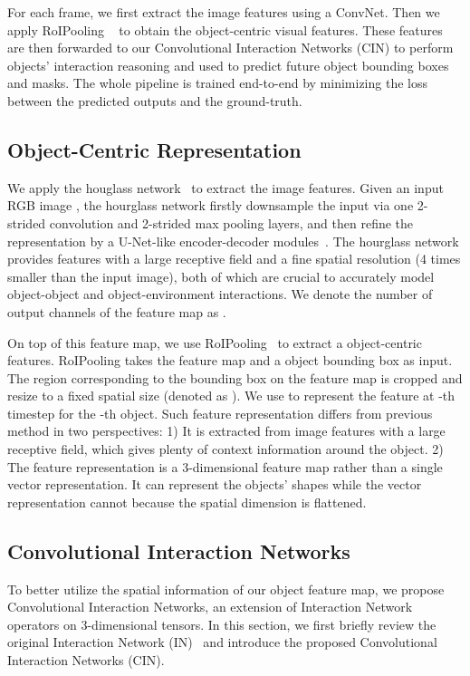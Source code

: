 \documentclass{article} \usepackage{iclr2021_conference,times}
\begin{document}
For each frame, we first extract the image features using a ConvNet. Then we apply RoIPooling ~\citep{girshick2015fast,he2017mask} to obtain the object-centric visual features.
These features are then forwarded to our Convolutional Interaction Networks (CIN) to perform objects' interaction reasoning and used to predict future object bounding boxes and masks.
The whole pipeline is trained end-to-end by minimizing the loss between the predicted outputs and the ground-truth.

\vspace{-0.5em}
\subsection{Object-Centric Representation}
\vspace{-0.5em}
We apply the houglass network~\citep{newell2016stacked} to extract the image features. Given an input RGB image , the hourglass network firstly downsample the input via one 2-strided convolution and 2-strided max pooling layers, and then refine the representation by a U-Net-like encoder-decoder modules~\citep{ronneberger2015u}. The hourglass network provides features with a large receptive field and a fine spatial resolution (4 times smaller than the input image), both of which are crucial to accurately model object-object and object-environment interactions. We denote the number of output channels of the feature map as .

On top of this feature map, we use RoIPooling~\citep{girshick2015fast} to extract a  object-centric features. RoIPooling takes the feature map and a object bounding box as input. The region corresponding to the bounding box on the feature map is cropped and resize to a fixed spatial size (denoted as ). We use  to represent the feature at -th timestep for the -th object. Such feature representation differs from previous method in two perspectives: 1) It is extracted from image features with a large receptive field, which gives plenty of context information around the object. 2) The feature representation is a 3-dimensional feature map rather than a single vector representation. It can represent the objects' shapes while the vector representation cannot because the spatial dimension is flattened.

\vspace{-0.5em}
\subsection{Convolutional Interaction Networks}
\vspace{-0.5em}
To better utilize the spatial information of our object feature map, we propose Convolutional Interaction Networks, an extension of Interaction Network operators on 3-dimensional tensors. In this section, we first briefly review the original Interaction Network (IN)~\citep{battaglia2016interaction, watters2017visual} and introduce the proposed Convolutional Interaction Networks (CIN). 
\end{document}
